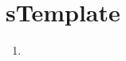 \NEWMOD

\section{sTemplate}



\begin{frame}[fragile,label=s-template] 
\modframetitle{\sTemplate}
\small
\begin{center}
\begin{minipage}{3.25in}
\begin{enumerate}
\item \hyperlink{foo<1>}     {\BUTTON {\ssFoo}}
\end{enumerate}
\end{minipage}
\end{center}
\end{frame}



